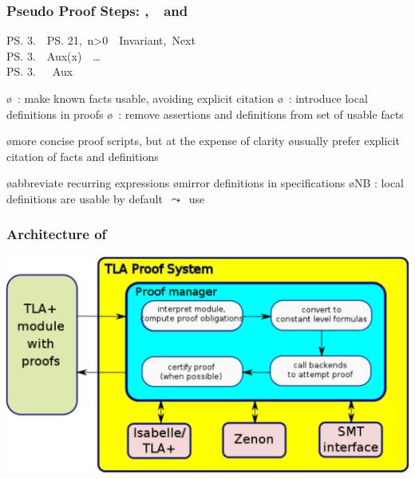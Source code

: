 \begin{frame}
  \frametitle{Pseudo Proof Steps: \DEFINE,\ \USE\ and \HIDE}

  \qquad\begin{tlablock}
    \ps{3}{.}\ \USE\ \ps{2}{1},\ n>0\ \DEFS\ Invariant,\ Next\\[2mm]
    \ps{3}{.}\ \DEFINE\ Aux(x)\ \deq\ \ldots\\[2mm]
    \ps{3}{.}\ \HIDE\ \DEF\ Aux
  \end{tlablock}

  \begin{itemize}
  \oo {}

    \begin{itemize}
    \o \USE\ : make known facts usable, avoiding explicit citation
    \o \DEFINE\ : introduce local definitions in proofs
    \o \HIDE\ : remove assertions and definitions from set of usable facts
    \end{itemize}

  \oo {}

    \begin{itemize}
    \o more concise proof scripts, but at the expense of clarity
    \o usually prefer explicit citation of facts and definitions
    \end{itemize}

  \oo {}

    \begin{itemize}
    \o abbreviate recurring expressions
    \o mirror  definitions in specifications
    \o \alert{NB :} local definitions are usable by default\ $\leadsto$\ use \HIDE
    \end{itemize}
  \end{itemize}
\end{frame}

\begin{frame}
  \frametitle{Architecture of \tlaps}

  \centerline{\includegraphics[width=1.0\linewidth]{architecture}}
\end{frame}

